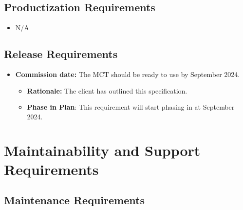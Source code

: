 \documentclass[12pt]{article}
\begin{document}
\subsection{Productization Requirements}
\begin{itemize}
    \item N/A
\end{itemize}
\subsection{Release Requirements}

\begin{itemize}
    \item \textbf{Commission date:} The MCT should be ready to use by September 2024.
    \begin{itemize}
        \item \textbf{Rationale: }The client has outlined this specification.
        \item \textbf{Phase in Plan}: This requirement will start phasing in at September 2024.
    \end{itemize}
\end{itemize}



\section{Maintainability and Support Requirements}
\subsection{Maintenance Requirements}
\end{document}
